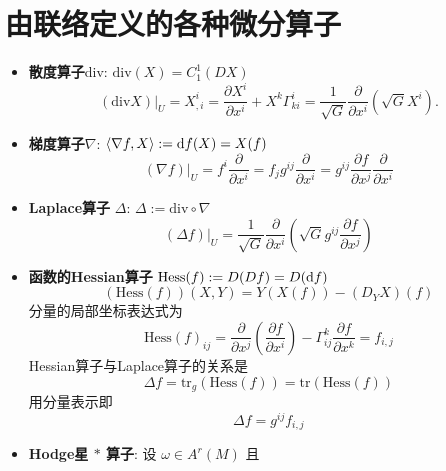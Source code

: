 \documentclass{book}
\newcommand{\md}{{\rm d}}
\newcommand{\pd}[2]{\frac{\partial #1}{\partial #2}}
\begin{document}
    \section{由联络定义的各种微分算子}
        \begin{itemize}
            \item \textbf{散度算子}div: $\mathrm{div}(X)=C_1^1(DX)$
            \begin{equation*}
                (\mathrm{div}X)|_U=X^i_{,i}=\pd{X^i}{x^i}+X^k\Gamma^i_{ki}=\frac{1}{\sqrt{G}}\pd{}{x^i}(\sqrt{G}X^i).
            \end{equation*}
            \item \textbf{梯度算子}$\nabla$: $\left\langle \nabla f,X\right\rangle:=\md{f}(X)=X(f)$ 
            \begin{equation*}
                (\nabla f)|_U = f^i\pd{}{x^i}=f_jg^{ij}\pd{}{x^i}=g^{ij}\pd{f}{x^j}\pd{}{x^i}
            \end{equation*}
            \item \textbf{Laplace算子} $\Delta$: $\Delta:=\mathrm{div}\circ\nabla$
            \begin{equation*}
                (\Delta f)|_U = \frac{1}{\sqrt{G}}\pd{}{x^i}\left(\sqrt{G}g^{ij}\pd{f}{x^j}\right)
            \end{equation*}
            \item \textbf{函数的Hessian算子} $\mathrm{Hess}(f):=D(Df)=D(\md f)$
            \begin{equation*}
                (\mathrm{Hess}(f))(X,Y)=Y(X(f))-(D_YX)(f)
            \end{equation*}
            分量的局部坐标表达式为
            \begin{equation*}
                \mathrm{Hess}(f)_{ij}=\pd{}{x^j}\left(\pd{f}{x^i}\right)-\Gamma^{k}_{ij}\pd{f}{x^k}=f_{i,j}
            \end{equation*}
            Hessian算子与Laplace算子的关系是
            \begin{equation*}
                \Delta f=\mathrm{tr}_g(\mathrm{Hess}(f))=\mathrm{tr}(\mathrm{Hess}(f))
            \end{equation*}
            用分量表示即
            \begin{equation*}
                \Delta f = g^{ij}f_{i,j}
            \end{equation*}
            \item \textbf{Hodge星 $*$ 算子}: 设 $\omega\in A^r(M)$ 且
            \begin{equation*}

\end{equation*}
\end{itemize}
\end{document}
